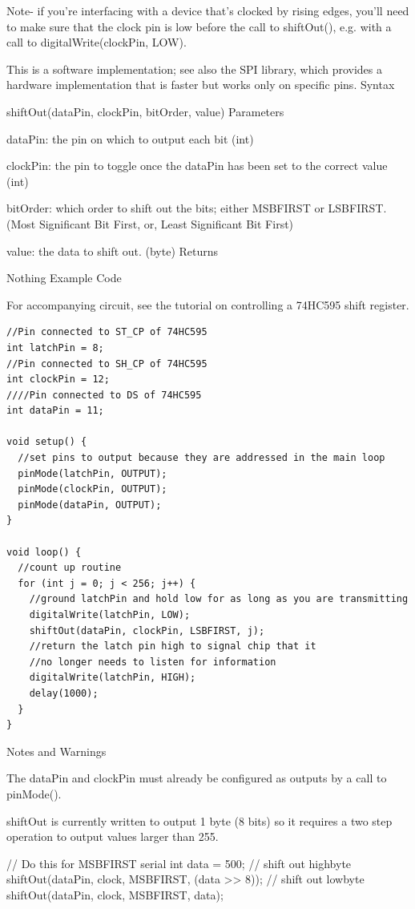 \documentclass[12pt,a4paper]{report}  %
\begin{document}
Note- if you’re interfacing with a device that’s clocked by rising edges, you’ll need to make sure that the clock pin is low before the call to shiftOut(), e.g. with a call to digitalWrite(clockPin, LOW).

This is a software implementation; see also the SPI library, which provides a hardware implementation that is faster but works only on specific pins.
Syntax

shiftOut(dataPin, clockPin, bitOrder, value)
Parameters

dataPin: the pin on which to output each bit (int)

clockPin: the pin to toggle once the dataPin has been set to the correct value (int)

bitOrder: which order to shift out the bits; either MSBFIRST or LSBFIRST. (Most Significant Bit First, or, Least Significant Bit First)

value: the data to shift out. (byte)
Returns

Nothing
Example Code

For accompanying circuit, see the tutorial on controlling a 74HC595 shift register.

\begin{lstlisting}[label=digitalwrite,caption=shiftOut]
//Pin connected to ST_CP of 74HC595
int latchPin = 8;
//Pin connected to SH_CP of 74HC595
int clockPin = 12;
////Pin connected to DS of 74HC595
int dataPin = 11;

void setup() {
  //set pins to output because they are addressed in the main loop
  pinMode(latchPin, OUTPUT);
  pinMode(clockPin, OUTPUT);
  pinMode(dataPin, OUTPUT);
}

void loop() {
  //count up routine
  for (int j = 0; j < 256; j++) {
    //ground latchPin and hold low for as long as you are transmitting
    digitalWrite(latchPin, LOW);
    shiftOut(dataPin, clockPin, LSBFIRST, j);
    //return the latch pin high to signal chip that it
    //no longer needs to listen for information
    digitalWrite(latchPin, HIGH);
    delay(1000);
  }
}
\end{lstlisting}

Notes and Warnings

The dataPin and clockPin must already be configured as outputs by a call to pinMode().

shiftOut is currently written to output 1 byte (8 bits) so it requires a two step operation to output values larger than 255.

// Do this for MSBFIRST serial
int data = 500;
// shift out highbyte
shiftOut(dataPin, clock, MSBFIRST, (data >> 8));
// shift out lowbyte
shiftOut(dataPin, clock, MSBFIRST, data);
\end{document}
